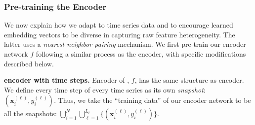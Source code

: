 \subsubsection{Pre-training the Encoder}
\label{ch02:sec:learning-the-encoder}


We now explain how we adapt  to time series data and to encourage learned embedding vectors to be diverse in capturing raw feature heterogeneity.
The latter uses a \emph{nearest neighbor pairing} mechanism.
We first pre-train our encoder network $f$ following a similar process as the  encoder, with specific modifications described below.


\noindent
\textbf{ encoder with time steps.}
Encoder of , $f$, has the same structure as  encoder.
We define every time step of every time series as its own \emph{snapshot}:  $(\mathbf{x}_i^{(\ell)}, y_i^{(\ell)})$.
Thus, we take the ``training data'' of our encoder network to be all the snapshots: $\bigcup_{i=1}^N \bigcup_{\ell=1}^{L_i} \{ (\mathbf{x}_i^{(\ell)}, y_i^{(\ell)}) \}$.


